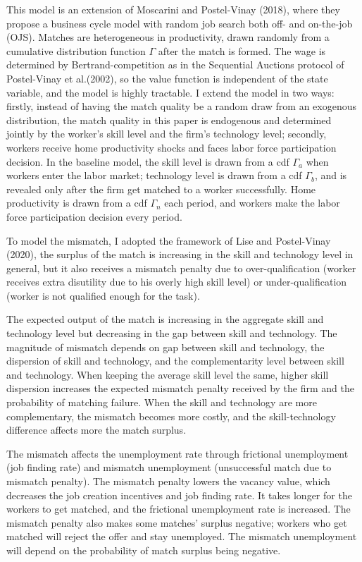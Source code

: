 \documentclass[12pt]{article}
\newcommand{\1}{\mathbb{1}}
\begin{document}
This model is an extension of Moscarini and Postel-Vinay (2018)\nocite{MPV2018}, where they propose a business cycle model with random job search both off- and on-the-job (OJS). Matches are heterogeneous in productivity, drawn randomly from a 
cumulative distribution function $\Gamma$ after the match is formed. The wage is determined by Bertrand-competition as in the Sequential Auctions protocol of Postel-Vinay et al.(2002)\nocite{PostelVinayetal2002}, so the value function is independent of the state variable, and the model is highly tractable. I extend the model in two ways: firstly, instead of having the match quality be a random draw from an exogenous distribution, the match quality in this paper is endogenous and determined jointly by the worker's skill level and the firm's technology level; secondly, workers receive home productivity shocks and faces labor force participation decision. In the baseline model, the skill level is drawn from a cdf $\Gamma_a$ when workers enter the labor market; technology level is drawn from a cdf $\Gamma_b$, and is revealed only after the firm get matched to a worker successfully. Home productivity is drawn from a cdf $\Gamma_n$ each period, and workers make the labor force participation decision every period. 

To model the mismatch, I adopted the framework of Lise and Postel-Vinay (2020)\nocite{LisePV2020}, the surplus of the match is increasing in the skill and technology level in general, but it also receives a mismatch penalty due to over-qualification (worker receives extra disutility due to his overly high skill level) or under-qualification (worker is not qualified enough for the task). 

The expected output of the match is increasing in the aggregate skill and technology level but decreasing in the gap between skill and technology. The magnitude of mismatch depends on gap between skill and technology, the dispersion of skill and technology, and the complementarity level between skill and technology. When keeping the average skill level the same, higher skill dispersion increases the expected mismatch penalty received by the firm and the probability of matching failure. When the skill and technology are more complementary, the mismatch becomes more costly, and the skill-technology difference affects more the match surplus. 

The mismatch affects the unemployment rate through frictional unemployment (job finding rate) and mismatch unemployment (unsuccessful match due to mismatch penalty). The mismatch penalty lowers the vacancy value, which decreases the job creation incentives and job finding rate. It takes longer for the workers to get matched, and the frictional unemployment rate is increased. The mismatch penalty also makes some matches' surplus negative; workers who get matched will reject the offer and stay unemployed. The mismatch unemployment will depend on the probability of match surplus being negative. 
\end{document}
